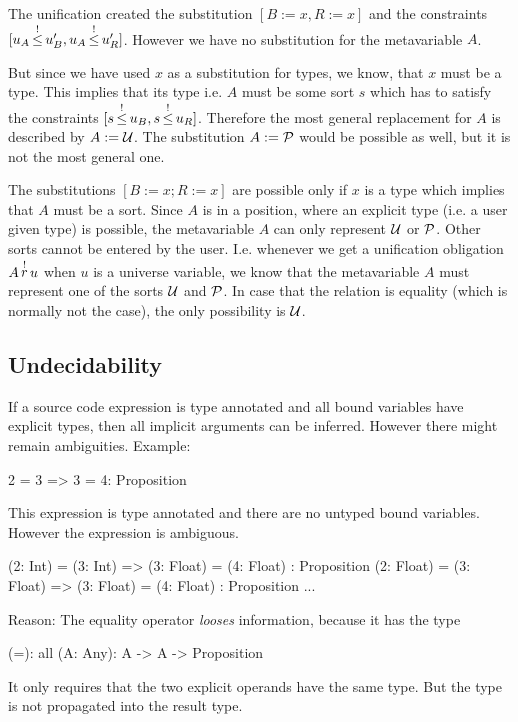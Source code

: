 The unification created the substitution $[B := x, R := x]$ and the constraints
$[u_A {\,\stackrel{!}{\le}\,} u_B', u_A {\,\stackrel{!}{\le}\,} u_R']$. However we have no substitution for the
metavariable $A$.

But since we have used $x$ as a substitution for types, we know, that $x$ must
be a type. This implies that its type i.e. $A$ must be some sort $s$ which has
to satisfy the constraints $[s {\,\stackrel{!}{\le}\,} u_B, s {\,\stackrel{!}{\le}\,} u_R]$. Therefore the most
general replacement for $A$ is described by $A := {\cal{U}}$. The substitution $A :=
{\cal{P}}$ would be possible as well, but it is not the most general one.


The substitutions $[B := x; R := x]$ are possible only if $x$ is a type which
implies that $A$ must be a sort. Since $A$ is in a position, where an explicit
type (i.e. a user given type) is possible, the metavariable $A$ can only
represent ${\cal{U}}$ or ${\cal{P}}$. Other sorts cannot be entered by the user. I.e.
whenever we get a unification obligation $A {\,\stackrel{!}{r}\,} u$ when $u$ is a
universe variable, we know that the metavariable $A$ must represent one of the
sorts ${\cal{U}}$ and ${\cal{P}}$. In case that the relation is equality (which is
normally not the case), the only possibility is ${\cal{U}}$.





\subsection{Undecidability}

If a source code expression is type annotated and all bound variables have
explicit types, then all implicit arguments can be inferred. However there might
remain ambiguities. Example:
%
\begin{alba}
   2 = 3  => 3 = 4: Proposition
\end{alba}
%
This expression is type annotated and there are no untyped bound variables.
However the expression is ambiguous.
%
\begin{alba}
   (2: Int)   = (3: Int)    =>  (3: Float) = (4: Float) : Proposition
   (2: Float) = (3: Float)  =>  (3: Float) = (4: Float) : Proposition
   ...
\end{alba}
%
Reason: The equality operator \emph{looses} information, because it has the
type
%
\begin{alba}
    (=): all (A: Any): A -> A -> Proposition
\end{alba}
%
It only requires that the two explicit operands have the same type. But the type
is not propagated into the result type.








